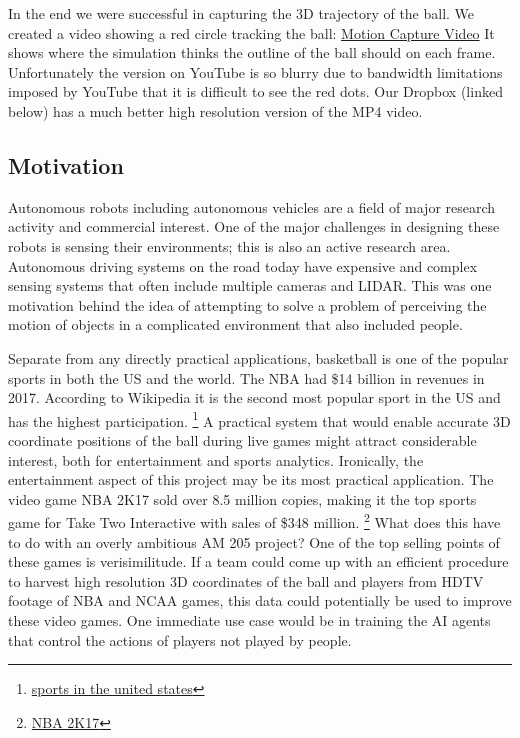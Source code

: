 \documentclass{article}
\begin{document}
In the end we were successful in capturing the 3D trajectory of the ball.  
We created a video showing a red circle tracking the ball: 
\href{https://www.youtube.com/watch?v=RI8qft0qE50&feature=youtu.be}{Motion Capture Video}
It shows where the simulation thinks the outline of the ball should on each frame.
Unfortunately the version on YouTube is so blurry due to bandwidth limitations imposed by YouTube 
that it is difficult to see the red dots.  
Our Dropbox (linked below) has a much better high resolution version of the MP4 video.

\subsection{Motivation}
Autonomous robots including autonomous vehicles are a field of major research activity and commercial interest.
One of the major challenges in designing these robots is sensing their environments; this is also an active research area.
Autonomous driving systems on the road today have expensive and complex sensing systems
that often include multiple cameras and LIDAR.
This was one motivation behind the idea of attempting to solve a problem of perceiving the motion
of objects in a complicated environment that also included people.

Separate from any directly practical applications, basketball is one of the popular sports in both the US and the world.
The NBA had \$14 billion in revenues in 2017.  According to Wikipedia  it is the second most popular sport in the US
and has the highest participation.   
\footnote{\href{https://en.wikipedia.org/wiki/Sports_in_the_United_States}{sports in the united states}}
A practical system that would enable accurate 3D coordinate positions of the ball during live games might
attract considerable interest, both for entertainment and sports analytics.  
Ironically, the entertainment aspect of this project may be its most practical application.
The video game NBA 2K17 sold over 8.5 million copies, making it the top sports game for
Take Two Interactive with sales of \$348 million.
\footnote{
\href{https://venturebeat.com/2017/08/02/with-8-5-million-sales-nba-2k17-is-more-dominant-than-the-warriors/}{NBA 2K17}}
What does this have to do with an overly ambitious AM 205 project?
One of the top selling points of these games is verisimilitude.  
If a team could come up with an efficient procedure to harvest high resolution 3D coordinates of the ball and players
from HDTV footage of NBA and NCAA games, this data could potentially be used to improve these video games.
One immediate use case would be in training the AI agents that control the actions of players not played by people.
\end{document}
